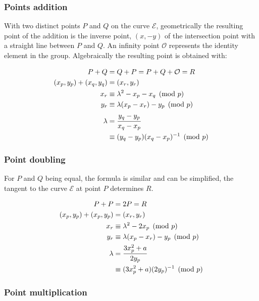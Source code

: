 \subsubsection{Points addition}
With two distinct points $P$ and $Q$ on the curve $\mathcal{E}$, geometrically
the resulting point of the addition is the inverse point, $(x, -y)$ of the
intersection point with a straight line between $P$ and $Q$. An infinity point
$\mathcal{O}$ represents the identity element in the group. Algebraically the
resulting point is obtained with:

\begin{equation}
\begin{split}
  P + Q &= Q + P = P + Q + \mathcal{O} = R \\
  (x_p, y_p) + (x_q, y_q) &= (x_r, y_r) \\
  x_r &\equiv \lambda^2 - x_p - x_q \pmod p \\
  y_r &\equiv \lambda(x_p - x_r) - y_p \pmod p  \\
  \lambda &= \cfrac{y_q - y_p}{x_q - x_p} \\
          &\equiv (y_q - y_p)(x_q - x_p)^{-1} \pmod p
\end{split}
\end{equation}

\subsubsection{Point doubling}

For $P$ and $Q$ being equal, the formula is similar and can be simplified, the tangent to the curve
$\mathcal{E}$ at point $P$ determines $R$.

\begin{equation}
\begin{split}
  P + P &= 2P = R \\
  (x_p, y_p) + (x_p, y_p) &= (x_r, y_r) \\
  x_r &\equiv \lambda^2 - 2x_p \pmod p \\
  y_r &\equiv \lambda(x_p - x_r) - y_p \pmod p  \\
  \lambda &= \cfrac{3x_p^2 + a}{2y_p} \\
          &\equiv (3x_p^2 + a)(2y_p)^{-1} \pmod p
\end{split}
\end{equation}

\subsubsection{Point multiplication}

